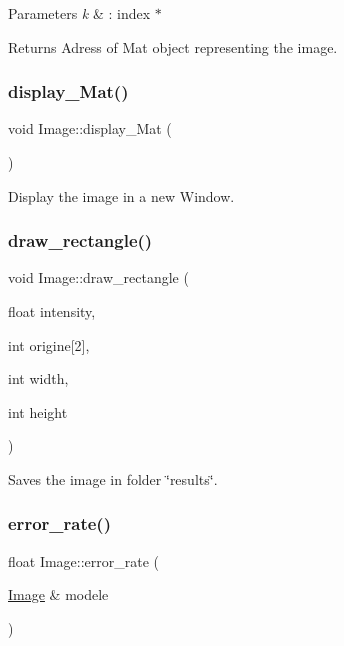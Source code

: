 \begin{DoxyParams}{Parameters}
{\em k} & \+: index $\ast$ \\
\hline
\end{DoxyParams}
\begin{DoxyReturn}{Returns}
Adress of Mat object representing the image. 
\end{DoxyReturn}
\mbox{\label{class_image_af92bb3e91201b76a9a0ccc642fb29a07}} 
\subsubsection{\texorpdfstring{display\+\_\+\+Mat()}{display\_Mat()}}
{\footnotesize\ttfamily void Image\+::display\+\_\+\+Mat (\begin{DoxyParamCaption}{ }\end{DoxyParamCaption})}

Display the image in a new Window. \mbox{\label{class_image_a2e32215c63cf4f3c6e981ad9cdda3a37}} 
\subsubsection{\texorpdfstring{draw\+\_\+rectangle()}{draw\_rectangle()}}
{\footnotesize\ttfamily void Image\+::draw\+\_\+rectangle (\begin{DoxyParamCaption}\item[{float}]{intensity,  }\item[{int}]{origine\mbox{[}2\mbox{]},  }\item[{int}]{width,  }\item[{int}]{height }\end{DoxyParamCaption})}



Saves the image in folder \char`\"{}results\char`\"{}. 

\mbox{\label{class_image_a10800b4a1dde1d81827264904d948d49}} 
\subsubsection{\texorpdfstring{error\+\_\+rate()}{error\_rate()}}
{\footnotesize\ttfamily float Image\+::error\+\_\+rate (\begin{DoxyParamCaption}\item[{\hyperlink{class_image}{Image} \&}]{modele }\end{DoxyParamCaption})}


